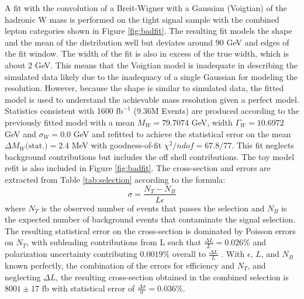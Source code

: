 A fit with the convolution of a Breit-Wigner with a Gaussian (Voigtian) of the hadronic W mass is performed on the tight signal sample with the combined lepton categories shown in Figure \ref{fig:badfit}. The resulting fit models the shape and the mean of the distribution well but deviates around 90 GeV and edges of the fit window. The width of the fit is also in excess of the true width, which is about 2 GeV. This means that the Voigtian model is inadequate in describing the simulated data likely due to the inadequacy of a single Gaussian for modeling the resolution. However, because the shape is similar to simulated data, the fitted model is used to understand the achievable mass resolution given a perfect model. Statistics consistent with 1600 $\text{fb}^{-1}$ (9.36M Events) are produced according to the previously fitted model with a mean  $M_W = 79.7074$ GeV, width $\Gamma_W = 10.6972$ GeV and $\sigma_W = 0.0$ GeV and refitted to achieve the statistical error on the mean $\Delta M_W \text{(stat.)} = 2.4$ MeV with goodness-of-fit $\chi^2 / ndof = 67.8/77$. This fit neglects background contributions but includes the off shell contributions. The toy model refit is also included in Figure \ref{fig:badfit}.
The cross-section and errors are extracted from Table \ref{tab:selection} according to the formula:
\begin{equation}
\sigma = \frac{N_T - N_B}{L \epsilon}
\end{equation}
where $N_T$ is the observed number of events that passes the selection and $N_B$ is the expected number of background events that contaminate the signal selection. The resulting statistical error on the cross-section is dominated by  Poisson errors on $N_T$, with subleading contributions from L such that $\frac{\Delta L}{L} = 0.026 \%$ and polarization uncertainty contributing $0.0019\%$ overall to $\frac{\Delta L}{L}$ \cite{ilcluminosity}. With $\epsilon$, $L$, and $N_B$ known perfectly, the combination of the errors for efficiency and $N_T$, and neglecting $\Delta L$, the resulting cross-section obtained in the combined selection is $8001 \pm 17 \, \, \text{fb}$ with statistical error of $\frac{\Delta \sigma}{\sigma} = 0.036 \%$. 
